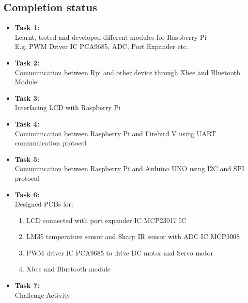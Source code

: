 \documentclass[a4paper,12pt,oneside]{book}
\begin{document}
\subsection*{Completion status}
\begin{itemize}
    \item \textbf{Task 1:}  \\ 
            Learnt, tested and developed different modules for Raspberry Pi \\
            E.g. PWM Driver IC PCA9685, ADC, Port Expander etc. \\
    \item \textbf{Task 2:} \\
            Communication between Rpi and other
            device through Xbee and Bluetooth Module \\
    \item \textbf{Task 3:} \\
            Interfacing LCD with Raspberry Pi  \\
    \item \textbf{Task 4:}  \\
            Communication between Raspberry Pi and 
            Firebird V using UART communication protocol    \\
    \item \textbf{Task 5:}  \\
            Communication between Raspberry Pi  
            and Arduino UNO       
            using I2C and SPI protocol     \\
    \item \textbf{Task 6:} \\
            Designed PCBs for: \\
            \begin{enumerate}
            \item LCD connected with port expander IC MCP23017 IC
            \item LM35 temperature sensor and Sharp IR sensor with ADC IC MCP3008
            \item PWM driver IC PCA9685 to drive DC motor and Servo motor 
            \item Xbee and Bluetooth module 
            \end{enumerate}
    \item \textbf{Task 7:} \\
            Challenge Activity
              
\end{itemize}
    
\end{document}
